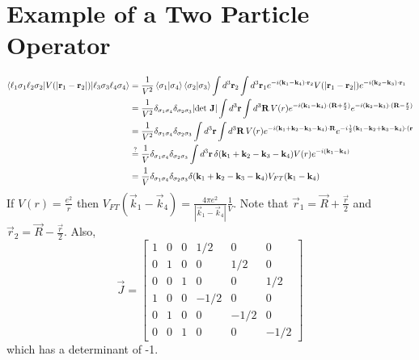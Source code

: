 \documentclass{article}
\begin{document}
\section{Example of a Two Particle Operator}
\begin{align*}
\braket{\ell_1 \sigma_1 \ell_2 \sigma_2| V(|\mathbf{r}_1 - \mathbf{r}_2|) |\ell_3 \sigma_3 \ell_4 \sigma_4} &= \frac{1}{V^2} \braket{\sigma_1 | \sigma_4} \braket{\sigma_2 | \sigma_3} \int d^3\mathbf{r}_2 \int d^3\mathbf{r}_1 e^{-i(\mathbf{k}_1 - \mathbf{k}_4)\cdot \mathbf{r}_2} V(|\mathbf{r}_1 - \mathbf{r}_2|)e^{-i(\mathbf{k}_2 - \mathbf{k}_3)\cdot \mathbf{r}_1}  \\
&= \frac{1}{V^2} \delta_{\sigma_1 \sigma_4}\delta_{\sigma_2 \sigma_3} |\text{det } \mathbf{J}|   \int  d^3 \mathbf{r} \int d^3 \mathbf{R} \, V(r) e^{-i(\mathbf{k}_1 - \mathbf{k}_4) \cdot (\mathbf{R} + \frac{\mathbf{r}}{2})}e^{-i(\mathbf{k}_2 - \mathbf{k}_3) \cdot (\mathbf{R} - \frac{\mathbf{r}}{2})}  \\
&= \frac{1}{V^2} \delta_{\sigma_1 \sigma_4}\delta_{\sigma_2 \sigma_3}  \int  d^3 \mathbf{r} \int d^3 \mathbf{R} \, V(r) e^{-i(\mathbf{k}_1 + \mathbf{k}_2 - \mathbf{k}_3 - \mathbf{k}_4) \cdot \mathbf{R} }e^{-i \frac{1}{2}(\mathbf{k}_1 -\mathbf{k}_2 +\mathbf{k}_3 - \mathbf{k}_4) \cdot (\mathbf{r}}  \\
&\stackrel{?}{=}  \frac{1}{V} \delta_{\sigma_1 \sigma_4}\delta_{\sigma_2 \sigma_3} \int d^3 \mathbf{r} \, \delta(\mathbf{k}_1 + \mathbf{k}_2 - \mathbf{k}_3 - \mathbf{k}_4) V(r) e^{-i(\mathbf{k}_1 - \mathbf{k}_4)} \\
&= \frac{1}{V}  \delta_{\sigma_1 \sigma_4}\delta_{\sigma_2 \sigma_3} \delta(\mathbf{k}_1 + \mathbf{k}_2 - \mathbf{k}_3 - \mathbf{k}_4) V_{FT} (\mathbf{k}_1 - \mathbf{k}_4)
\end{align*}
If $V(r) = \frac{e^2}{r}$ then $V_{FT}(\vec{k}_1 - \vec{k}_4) = \frac{4\pi e^2}{|\vec{k}_1 - \vec{k}_4|} \frac{1}{V}$. Note that $\vec{r}_1 = \vec{R} + \frac{\vec{r}}{2}$ and $\vec{r}_2 = \vec{R} - \frac{\vec{r}}{2}$. Also, \[\vec{J} = \begin{bmatrix} 1 & 0 & 0 & 1/2 & 0 & 0 \\ 0 & 1 & 0 & 0 & 1/2 & 0 \\ 0 & 0 & 1 & 0 & 0 & 1/2 \\
1 & 0 & 0 & -1/2 & 0 & 0 \\ 0 & 1 & 0 & 0 & -1/2 & 0 \\ 0 & 0 & 1 & 0 & 0 & -1/2 \end{bmatrix} \] which has a determinant of -1.
\end{document}
